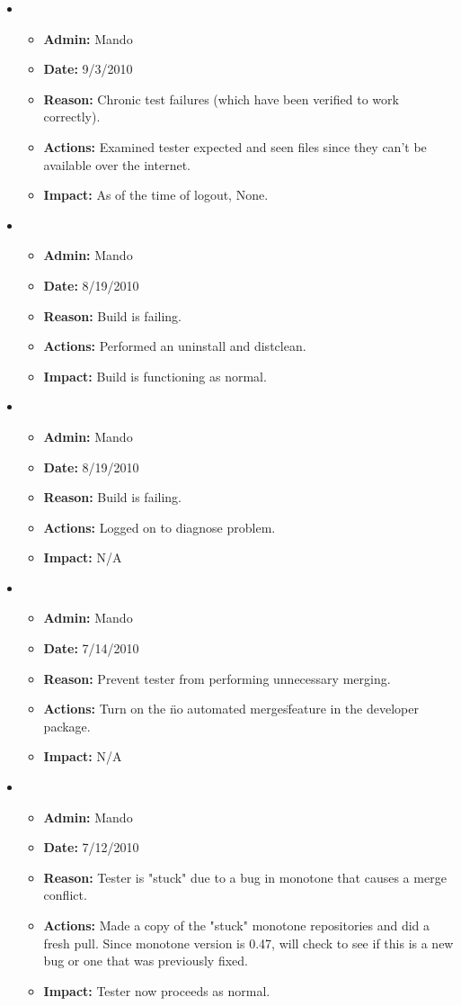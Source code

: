 \documentclass[12pt]{article}
\begin{document}
\begin{itemize}
\item 
\begin{itemize}
\item[] {\bf Admin:} Mando
\item[] {\bf Date:} 9/3/2010
\item[] {\bf Reason:} Chronic test failures (which have been verified to work correctly). 
\item[] {\bf Actions:} Examined tester expected and seen files since they can't be available over the internet.
\item[] {\bf Impact:} As of the time of logout, None.
\end{itemize}
	
\item 
\begin{itemize}
\item[] {\bf Admin:} Mando
\item[] {\bf Date:} 8/19/2010
\item[] {\bf Reason:} Build is failing. 
\item[] {\bf Actions:} Performed an uninstall and distclean.
\item[] {\bf Impact:} Build is functioning as normal.
\end{itemize}
	
\item 
\begin{itemize}
\item[] {\bf Admin:} Mando
\item[] {\bf Date:} 8/19/2010
\item[] {\bf Reason:} Build is failing. 
\item[] {\bf Actions:} Logged on to diagnose problem.
\item[] {\bf Impact:} N/A
\end{itemize}
	
\item 
\begin{itemize}
\item[] {\bf Admin:} Mando
\item[] {\bf Date:} 7/14/2010
\item[] {\bf Reason:} Prevent tester from performing unnecessary merging. 
\item[] {\bf Actions:} Turn on the \"no automated merges\" feature in the developer package.
\item[] {\bf Impact:} N/A
\end{itemize}

\item 
\begin{itemize}
\item[] {\bf Admin:} Mando
\item[] {\bf Date:} 7/12/2010
\item[] {\bf Reason:} Tester is "stuck" due to a bug in monotone that causes a merge conflict.
\item[] {\bf Actions:} Made a copy of the "stuck" monotone repositories and did a fresh pull. Since monotone version is 0.47, will check to see if this is a new bug or one that was previously fixed.
\item[] {\bf Impact:} Tester now proceeds as normal. 
\end{itemize}


\end{itemize}
\end{document}
